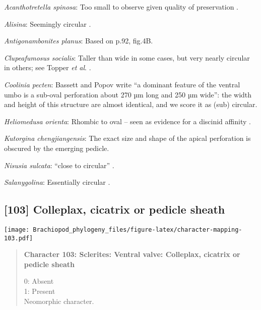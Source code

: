 \documentclass[openany]{book}
\theoremstyle{definition}
\theoremstyle{definition}
\theoremstyle{definition}
\theoremstyle{remark}
\begin{document}
\hypertarget{Acanthotretella_spinosa-coding-102}{}
\emph{Acanthotretella spinosa}: Too small to observe given quality of
preservation \citep{Holmer2006Aspinose}.

\hypertarget{Alisina-coding-102}{}
\emph{Alisina}: Seemingly circular \citep{Zhang2011Anobolellate}.

\hypertarget{Antigonambonites_planus-coding-102}{}
\emph{Antigonambonites planus}: Based on p.92, fig.4B.

\hypertarget{Clupeafumosus_socialis-coding-102}{}
\emph{Clupeafumosus socialis}: Taller than wide in some cases, but very
nearly circular in others; see Topper \emph{et al}.
\citeyearpar{Topper2013Reappraisalof}.

\hypertarget{Coolinia_pecten-coding-102}{}
\emph{Coolinia pecten}: Bassett and Popov write ``a dominant feature of
the ventral umbo is a sub-oval perforation about 270 µm long and 250 µm
wide'': the width and height of this structure are almost identical, and
we score it as (sub) circular.

\hypertarget{Heliomedusa_orienta-coding-102}{}
\emph{Heliomedusa orienta}: Rhombic to oval -- seen as evidence for a
discinid affinity \citep{Chen2007Reinterpretationof}.

\hypertarget{Kutorgina_chengjiangensis-coding-102}{}
\emph{Kutorgina chengjiangensis}: The exact size and shape of the apical
perforation is obscured by the emerging pedicle.

\hypertarget{Nisusia_sulcata-coding-102}{}
\emph{Nisusia sulcata}: ``close to circular''
\citep{Holmer2018Evolutionarysignificance}.

\hypertarget{Salanygolina-coding-102}{}
\emph{Salanygolina}: Essentially circular \citep[fig.
4]{Holmer2009Theenigmatic}.

\subsection*{{[}103{]} Colleplax, cicatrix or pedicle
sheath}\label{colleplax-cicatrix-or-pedicle-sheath}

\texttt{[image: Brachiopod\_phylogeny\_files/figure-latex/character-mapping-103.pdf]}

\begin{quote}
\textbf{Character 103: Sclerites: Ventral valve: Colleplax, cicatrix or
pedicle sheath}

0: Absent\\
1: Present\\
Neomorphic character.
\end{quote}
\end{document}
